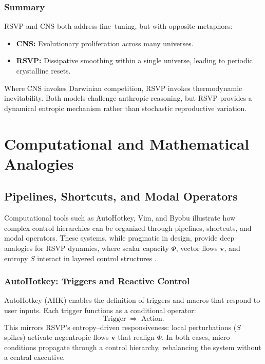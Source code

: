 \documentclass[a4paper,11pt,openany]{book}
\begin{document}
\section{Summary}

RSVP and CNS both address fine–tuning, but with opposite metaphors:
\begin{itemize}
  \item \textbf{CNS:} Evolutionary proliferation across many universes.  
  \item \textbf{RSVP:} Dissipative smoothing within a single universe, leading to periodic 
  crystalline resets.  
\end{itemize}
Where CNS invokes Darwinian competition, RSVP invokes thermodynamic inevitability. Both 
models challenge anthropic reasoning, but RSVP provides a dynamical entropic mechanism 
rather than stochastic reproductive variation.

\part{Computational and Mathematical Analogies}

\chapter{Pipelines, Shortcuts, and Modal Operators}

Computational tools such as AutoHotkey, Vim, and Byobu illustrate how complex control 
hierarchies can be organized through pipelines, shortcuts, and modal operators. These 
systems, while pragmatic in design, provide deep analogies for RSVP dynamics, where scalar 
capacity $\Phi$, vector flows $\mathbf{v}$, and entropy $S$ interact in layered control 
structures \citep{sipser2013tcs}.  

\section{AutoHotkey: Triggers and Reactive Control}

AutoHotkey (AHK) enables the definition of triggers and macros that respond to user inputs. 
Each trigger functions as a conditional operator:
\[
\text{Trigger} \;\Rightarrow\; \text{Action}.
\]
This mirrors RSVP’s entropy–driven responsiveness: local perturbations ($S$ spikes) activate 
negentropic flows $\mathbf{v}$ that realign $\Phi$. In both cases, micro–conditions propagate 
through a control hierarchy, rebalancing the system without a central executive.  
\end{document}
